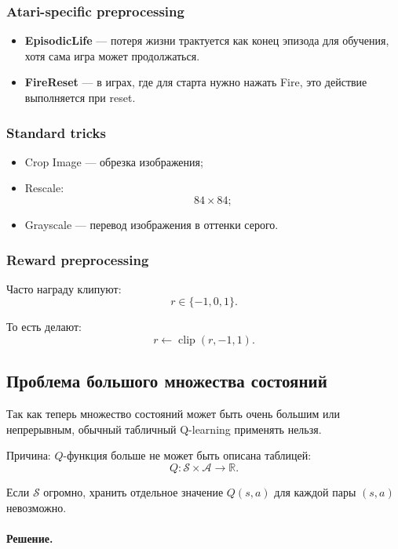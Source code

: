\documentclass[12pt,a4paper]{article}
\begin{document}
\subsubsection{Atari-specific preprocessing}

\begin{itemize}
    \item \textbf{EpisodicLife} --- потеря жизни трактуется как конец эпизода для обучения, хотя сама игра может продолжаться.
    \item \textbf{FireReset} --- в играх, где для старта нужно нажать Fire, это действие выполняется при reset.
\end{itemize}

\subsubsection{Standard tricks}

\begin{itemize}
    \item Crop Image --- обрезка изображения;
    \item Rescale:
    \[
    84 \times 84;
    \]
    \item Grayscale --- перевод изображения в оттенки серого.
\end{itemize}

\subsubsection{Reward preprocessing}

Часто награду клипуют:
\[
r \in \{-1,0,1\}.
\]

То есть делают:
\[
r
\leftarrow
\operatorname{clip}(r,-1,1).
\]

\subsection{Проблема большого множества состояний}

Так как теперь множество состояний может быть очень большим или непрерывным, обычный табличный Q-learning применять нельзя.

Причина: $Q$-функция больше не может быть описана таблицей:
\[
Q : \mathcal S \times \mathcal A \to \mathbb R.
\]

Если $\mathcal S$ огромно, хранить отдельное значение $Q(s,a)$ для каждой пары $(s,a)$ невозможно.

\paragraph{Решение.}
\end{document}
